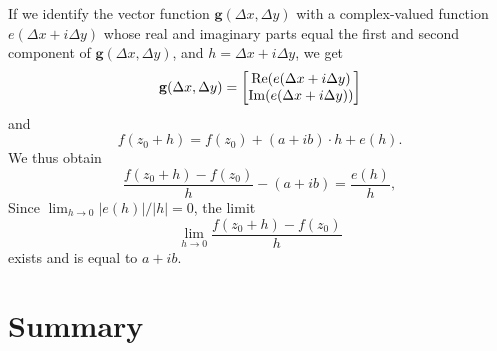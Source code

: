 If we identify the vector function $\mathbf{g}(\Delta x, \Delta y)$ with a complex-valued function $e(\Delta x + i \Delta y)$ whose real and imaginary parts equal the first and second component of $\mathbf{g}(\Delta x, \Delta y)$, and $h=\Delta x + i \Delta y$, we get
$$
\mathbf{g}(\Delta x, \Delta y) = \begin{bmatrix} \operatorname{\mathrm{Re}}(e(\Delta x + i \Delta y) \\ \operatorname{\mathrm{Im}}(e(\Delta x + i \Delta y)) \end{bmatrix}
$$
and 
$$
f(z_0 + h) = f(z_0) + (a+ib)\cdot h + e(h).
$$
We thus obtain
$$
 \frac{f(z_0+h) - f(z_0)}{h} - (a+ib) = \frac{e(h)}{h},
$$
Since $\lim_{h\rightarrow 0} |e(h)|/|h|=0$, the limit 
$$
\lim_{h\rightarrow 0} \frac{f(z_0+h)-f(z_0)}{h}
$$
exists and is equal to $a+ib$.





\section*{Summary}

